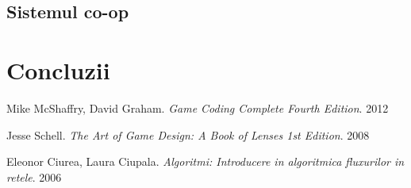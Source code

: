 \documentclass[12pt, a4paper]{article}
\begin{document}
	\subsection{Sistemul co-op}
	
	
	
	
	\section{Concluzii}
	
	
	\pagebreak
	\begin{thebibliography}{3}
		Mike McShaffry, David Graham. \newline
		\textit{Game Coding Complete Fourth Edition}. 2012
		
		Jesse Schell.  \newline
		\textit{The Art of Game Design: A Book of Lenses 1st Edition}. 2008
		
		Eleonor Ciurea, Laura Ciupala.  \newline
		\textit{Algoritmi: Introducere in algoritmica fluxurilor in retele}. 2006
		
	\end{thebibliography}
	
	
\end{document}
